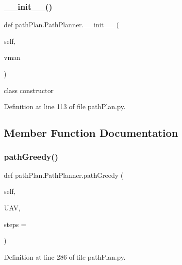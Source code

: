 \subsubsection{\texorpdfstring{\+\_\+\+\_\+init\+\_\+\+\_\+()}{\_\_init\_\_()}}
{\footnotesize\ttfamily def path\+Plan.\+Path\+Planner.\+\_\+\+\_\+init\+\_\+\+\_\+ (\begin{DoxyParamCaption}\item[{}]{self,  }\item[{}]{vman }\end{DoxyParamCaption})}



class constructor 



Definition at line 113 of file path\+Plan.\+py.



\subsection{Member Function Documentation}
\mbox{\label{classpath_plan_1_1_path_planner_aced5344f393f49830c28225b435fe0c2}} 
\subsubsection{\texorpdfstring{path\+Greedy()}{pathGreedy()}}
{\footnotesize\ttfamily def path\+Plan.\+Path\+Planner.\+path\+Greedy (\begin{DoxyParamCaption}\item[{}]{self,  }\item[{}]{U\+AV,  }\item[{}]{steps = {} }\end{DoxyParamCaption})}



Definition at line 286 of file path\+Plan.\+py.

\mbox{\label{classpath_plan_1_1_path_planner_abe0f6150b91e41dc9625d29a7005e37d}} 
